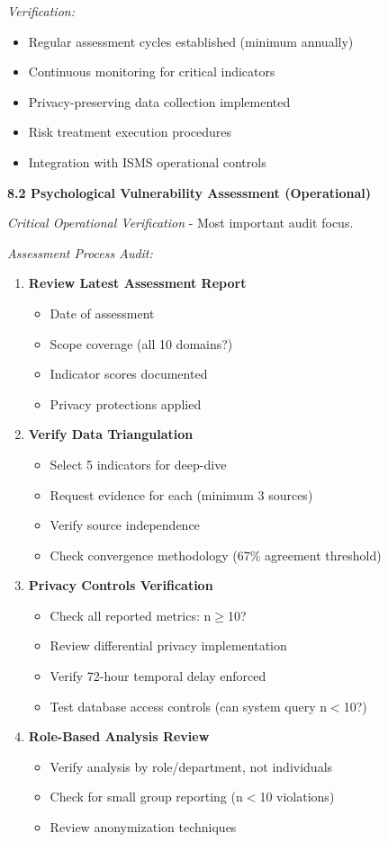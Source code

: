 \documentclass[11pt,a4paper]{article}
\begin{document}
\textit{Verification:}
\begin{itemize}
\item Regular assessment cycles established (minimum annually)
\item Continuous monitoring for critical indicators
\item Privacy-preserving data collection implemented
\item Risk treatment execution procedures
\item Integration with ISMS operational controls
\end{itemize}

\textbf{8.2 Psychological Vulnerability Assessment (Operational)}

\textit{Critical Operational Verification} - Most important audit focus.

\textit{Assessment Process Audit:}

\begin{enumerate}
\item \textbf{Review Latest Assessment Report}
  \begin{itemize}
  \item Date of assessment
  \item Scope coverage (all 10 domains?)
  \item Indicator scores documented
  \item Privacy protections applied
  \end{itemize}

\item \textbf{Verify Data Triangulation}
  \begin{itemize}
  \item Select 5 indicators for deep-dive
  \item Request evidence for each (minimum 3 sources)
  \item Verify source independence
  \item Check convergence methodology (67\% agreement threshold)
  \end{itemize}

\item \textbf{Privacy Controls Verification}
  \begin{itemize}
  \item Check all reported metrics: n$\geq$10?
  \item Review differential privacy implementation
  \item Verify 72-hour temporal delay enforced
  \item Test database access controls (can system query n$<$10?)
  \end{itemize}

\item \textbf{Role-Based Analysis Review}
  \begin{itemize}
  \item Verify analysis by role/department, not individuals
  \item Check for small group reporting (n$<$10 violations)
  \item Review anonymization techniques
  \end{itemize}
\end{enumerate}
\end{document}
